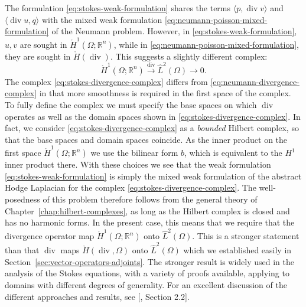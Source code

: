 {The formulation \eqref{eq:stokes-weak-formulation} shares the terms $\langle p,\operatorname{div}v\rangle$ and $\langle\operatorname{div}u,q\rangle$ with the mixed weak formulation \eqref{eq:neumann-poisson-mixed-formulation} of the Neumann problem. However, in \eqref{eq:stokes-weak-formulation}, $u,v$ are sought in $\mathring H^1(\Omega;\mathbb R^n)$, while in \eqref{eq:neumann-poisson-mixed-formulation}, they are sought in $\mathring H(\operatorname{div})$. This suggests a slightly different complex:}
\begin{equation}\label{eq:stokes-divergence-complex}
\mathring H^1(\Omega;\mathbb R^n)\xrightarrow{\operatorname{div}}\hat L^2(\Omega)\to0.
\end{equation}
{The complex \eqref{eq:stokes-divergence-complex} differs from \eqref{eq:neumann-divergence-complex} in that more smoothness is required in the first space of the complex. To fully define the complex we must specify the base spaces on which $\operatorname{div}$ operates as well as the domain spaces shown in \eqref{eq:stokes-divergence-complex}. In fact, we consider \eqref{eq:stokes-divergence-complex} as a \emph{bounded} Hilbert complex, so that the base spaces and domain spaces coincide. As the inner product on the first space $\mathring H^1(\Omega;\mathbb R^n)$ we use the bilinear form $b$, which is equivalent to the $H^1$ inner product there. With these choices we see that the weak formulation \eqref{eq:stokes-weak-formulation} is simply the mixed weak formulation of the abstract Hodge Laplacian for the complex \eqref{eq:stokes-divergence-complex}. The well-posedness of this problem therefore follows from the general theory of Chapter~\ref{chap:hilbert-complexes}, as long as the Hilbert complex is closed and has no harmonic forms. In the present case, this means that we require that the divergence operator map $\mathring H^1(\Omega;\mathbb R^n)$ onto $\hat L^2(\Omega)$. This is a stronger statement than that $\operatorname{div}$ maps $\mathring H(\operatorname{div},\Omega)$ onto $\hat L^2(\Omega)$ which we established easily in Section~\ref{sec:vector-operators-adjoints}. The stronger result is widely used in the analysis of the Stokes equations, with a variety of proofs available, applying to domains with different degrees of generality. For an excellent discussion of the different approaches and results, see [, Section 2.2].}

